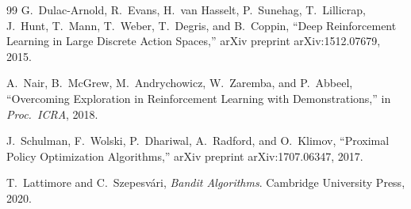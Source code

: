 \documentclass[10pt,conference]{IEEEtran}
\begin{document}
\begin{thebibliography}{99}
G.~Dulac-Arnold, R.~Evans, H.~van Hasselt, P.~Sunehag,
T.~Lillicrap, J.~Hunt, T.~Mann, T.~Weber, T.~Degris, and B.~Coppin,
``Deep Reinforcement Learning in Large Discrete Action Spaces,''
arXiv preprint arXiv:1512.07679, 2015.

A.~Nair, B.~McGrew, M.~Andrychowicz, W.~Zaremba, and P.~Abbeel,
``Overcoming Exploration in Reinforcement Learning with Demonstrations,''
in \emph{Proc.\ ICRA}, 2018.

J.~Schulman, F.~Wolski, P.~Dhariwal, A.~Radford, and O.~Klimov,
``Proximal Policy Optimization Algorithms,''
arXiv preprint arXiv:1707.06347, 2017.

T.~Lattimore and C.~Szepesv{\'a}ri,
\emph{Bandit Algorithms}.
Cambridge University Press, 2020.

\end{thebibliography}
\end{document}
